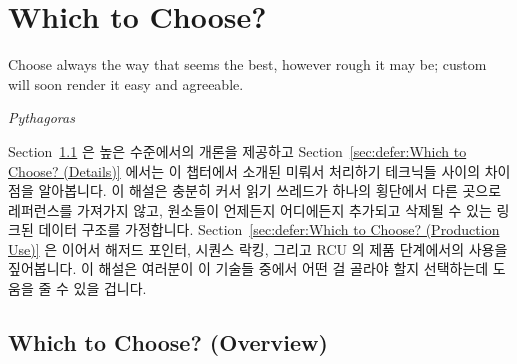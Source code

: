 
\section{Which to Choose?}
\label{sec:defer:Which to Choose?}
%
\epigraph{Choose always the way that seems the best, however rough it
	  may be; custom will soon render it easy and agreeable.}
	  {\emph{Pythagoras}}

Section~\ref{sec:defer:Which to Choose? (Overview)}
은 높은 수준에서의 개론을 제공하고
Section~\ref{sec:defer:Which to Choose? (Details)}
에서는 이 챕터에서 소개된 미뤄서 처리하기 테크닉들 사이의 차이점을 알아봅니다.
이 해설은 충분히 커서 읽기 쓰레드가 하나의 횡단에서 다른 곳으로 레퍼런스를
가져가지 않고, 원소들이 언제든지 어디에든지 추가되고 삭제될 수 있는 링크된
데이터 구조를 가정합니다.
Section~\ref{sec:defer:Which to Choose? (Production Use)}
은 이어서 해저드 포인터, 시퀀스 락킹, 그리고 RCU 의 제품 단계에서의 사용을
짚어봅니다.
이 해설은 여러분이 이 기술들 중에서 어떤 걸 골라야 할지 선택하는데 도움을 줄 수
있을 겁니다.
\iffalse

Section~\ref{sec:defer:Which to Choose? (Overview)}
provides a high-level overview and then
Section~\ref{sec:defer:Which to Choose? (Details)}
provides a more detailed view
of the differences between the deferred-processing techniques presented
in this chapter.
This discussion assumes a linked data structure that is large enough
that readers do not hold references from one traversal to another,
and where elements might be added to and removed from the structure
at any location and at any time.
Section~\ref{sec:defer:Which to Choose? (Production Use)}
then points out a few publicly visible production uses of
hazard pointers, sequence locking, and RCU.
This discussion should help you to make an informed choice between
these techniques.
\fi

\subsection{Which to Choose? (Overview)}
\label{sec:defer:Which to Choose? (Overview)}

